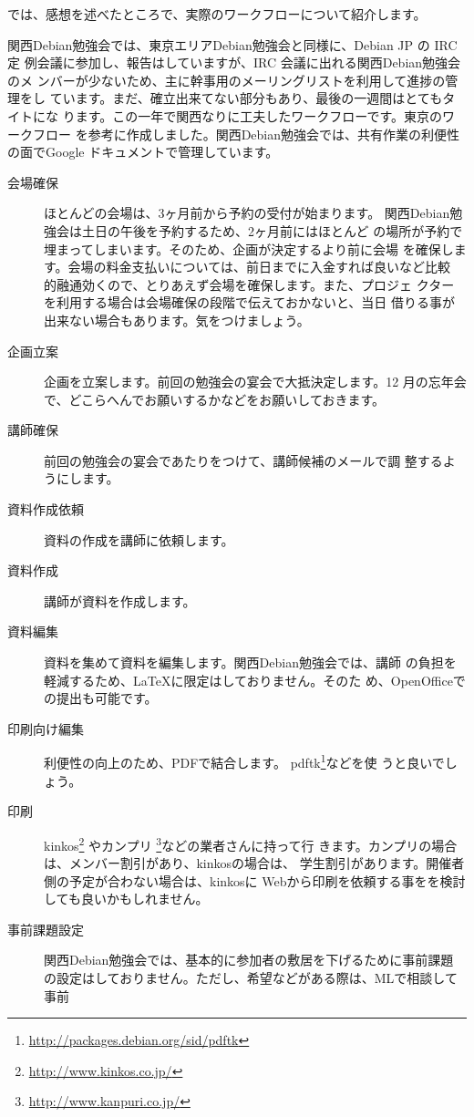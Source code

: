 \documentclass[mingoth,a4paper]{jsarticle}
\begin{document}
では、感想を述べたところで、実際のワークフローについて紹介します。

関西Debian勉強会では、東京エリアDebian勉強会と同様に、Debian JP の IRC定
例会議に参加し、報告はしていますが、IRC 会議に出れる関西Debian勉強会のメ
ンバーが少ないため、主に幹事用のメーリングリストを利用して進捗の管理をし
ています。まだ、確立出来てない部分もあり、最後の一週間はとてもタイトにな
ります。この一年で関西なりに工夫したワークフローです。東京のワークフロー
を参考に作成しました。関西Debian勉強会では、共有作業の利便性の面でGoogle
ドキュメントで管理しています。

\begin{description}
\item[会場確保] ほとんどの会場は、3ヶ月前から予約の受付が始まります。
	   関西Debian勉強会は土日の午後を予約するため、2ヶ月前にはほとんど
	   の場所が予約で埋まってしまいます。そのため、企画が決定するより前に会場
	   を確保します。会場の料金支払いについては、前日までに入金すれば良いなど比較
	   的融通効くので、とりあえず会場を確保します。また、プロジェ
	   クターを利用する場合は会場確保の段階で伝えておかないと、当日
	   借りる事が出来ない場合もあります。気をつけましょう。
\item[企画立案] 企画を立案します。前回の勉強会の宴会で大抵決定します。12
	   月の忘年会で、どこらへんでお願いするかなどをお願いしておきます。
\item[講師確保] 前回の勉強会の宴会であたりをつけて、講師候補のメールで調
	   整するようにします。
\item[資料作成依頼] 資料の作成を講師に依頼します。
\item[資料作成] 講師が資料を作成します。
\item[資料編集] 資料を集めて資料を編集します。関西Debian勉強会では、講師
	   の負担を軽減するため、\LaTeX{}に限定はしておりません。そのた
	   め、OpenOfficeでの提出も可能です。
\item[印刷向け編集] 利便性の向上のため、PDFで結合します。
	   pdftk\footnote{\url{http://packages.debian.org/sid/pdftk}}などを使
	   うと良いでしょう。
\item[印刷] kinkos\footnote{\url{http://www.kinkos.co.jp/}} やカンプリ
	   \footnote{\url{http://www.kanpuri.co.jp/}}などの業者さんに持って行
	   きます。カンプリの場合は、メンバー割引があり、kinkosの場合は、
	   学生割引があります。開催者側の予定が合わない場合は、kinkosに
	   Webから印刷を依頼する事をを検討しても良いかもしれません。
\item[事前課題設定] 関西Debian勉強会では、基本的に参加者の敷居を下げるために事前課題
	   の設定はしておりません。ただし、希望などがある際は、MLで相談して事前

\end{description}
\end{document}
